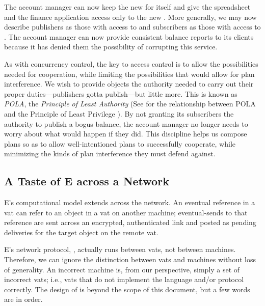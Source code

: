 \documentclass{llncs}
\begin{document}
The account manager can now keep the new  for
itself and give the spreadsheet and the finance application access
only to the new . More generally, we may now
describe publishers as those with access to  and
subscribers as those with access to . The account
manager can now provide consistent balance reports to its clients
because it has denied them the possibility of corrupting this
service. 

As with concurrency control, the key to access control is to allow the
possibilities needed for cooperation, while limiting the possibilities
that would allow for plan interference. We wish to provide
objects the authority needed to carry out their proper
duties---publishers gotta publish---but little more. This is known as
\emph{POLA}, the \emph{Principle of Least Authority} (See
\cite{miller:paradigm} for the relationship between POLA and the
Principle of Least Privilege \cite{SaltzerSc75}). By not granting its
subscribers the authority to publish a bogus balance, the account
manager no longer needs to worry about what would happen if they
did. This discipline helps us compose plans so as to allow
well-intentioned plans to successfully cooperate, while minimizing the
kinds of plan interference they must defend against.

\subsection{A Taste of E across a Network}

E's computational model extends across the network.
An eventual reference in a vat can refer to an object in
a vat on another machine; eventual-sends to that reference are sent
across an encrypted, authenticated link and posted as pending
deliveries for the target object on the remote vat.

E's network protocol, , actually runs between vats, not
between machines. Therefore, we can ignore the distinction between
vats and machines without loss of generality. An incorrect machine
is, from our perspective, simply a set of incorrect vats; i.e., vats
that do not implement the language and/or protocol correctly. The
design of  is beyond the scope of this document, but a
few words are in order.
\end{document}
